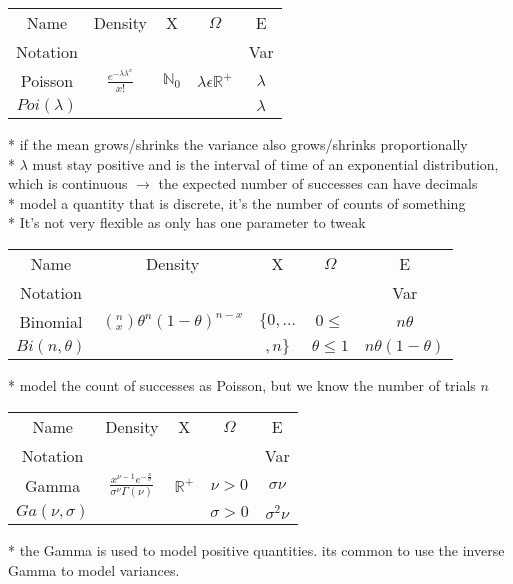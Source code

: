 \documentclass[10pt,landscape]{article}
\begin{document}
\begin{multicols}{3}
\begin{center}
\begin{tabular}{ |ccccc| }
\hline
Name & Density & X & $\Omega$ & E \\
Notation &  &  &  & Var \\
\hline
Poisson & $\frac{e^{-\lambda \lambda^x}}{x!}$ & $\mathbb{N}_{0}$ & $\lambda \epsilon \mathbb{R}^{+}$ & $\lambda$ \\
$Poi(\lambda)$ &  &  &  & $\lambda$ \\
\end{tabular}
\end{center}
* if the mean grows/shrinks the variance also grows/shrinks proportionally \\
* $\lambda$ must stay positive and is the interval of time of an exponential distribution, which is continuous $\rightarrow$ the expected number of successes can have decimals \\
* model a quantity that is discrete, it's the number of counts of something \\
* It's not very flexible as only has one parameter to tweak

\begin{center}
\begin{tabular}{ |ccccc| }
\hline
Name & Density & X & $\Omega$ & E \\
Notation &  &  &  & Var \\
\hline
Binomial & $\left(\text{}_x^n\right) \theta^n (1 - \theta)^{n - x}$ & $\{0,...$ & $0 \leq$ & $n \theta$ \\
$Bi(n, \theta)$ &  & $,n\}$ & $\theta \leq 1$ & $n \theta (1 - \theta)$ \\
\end{tabular}
\end{center}
* model the count of successes as Poisson, but we know the number of trials $n$

\begin{center}
\begin{tabular}{ |ccccc| }
\hline
Name & Density & X & $\Omega$ & E \\
Notation &  &  &  & Var \\
\hline
Gamma & $\frac{x^{\nu - 1} e^{-\frac{x}{\sigma}}}{\sigma^\nu \Gamma(\nu)}$ & $\mathbb{R}^{+}$ & $\nu > 0$ & $\sigma \nu$ \\
$Ga(\nu,\sigma)$ &  &  & $\sigma > 0$ & $\sigma^2 \nu$ \\
\end{tabular}
\end{center}
* the Gamma is used to model positive quantities. its common to use the inverse Gamma to model variances.


\end{multicols}
\end{document}

